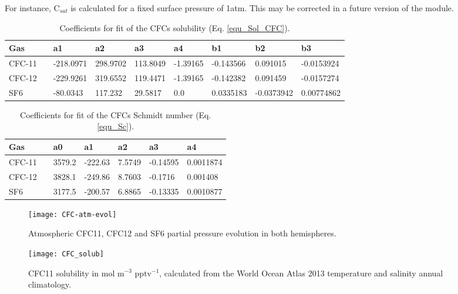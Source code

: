 \documentclass[../main/TOP_manual]{subfiles}
\begin{document}

For instance, C$_{sat}$ is calculated for a fixed surface pressure of 1atm. This may be corrected in a future version of the module.


\begin{table}[!t]
\caption{Coefficients for fit of the CFCs solubility (Eq. \autoref{equ_Sol_CFC}).}
\vskip4mm
\centering
\begin{tabular}{l l l l l l l l l}
\hline
Gas   & & a1 & a2 & a3 & a4 & b1 & b2 & b3 \\
\hline
CFC-11 & & -218.0971 & 298.9702 & 113.8049 & -1.39165 & -0.143566  & 0.091015   & -0.0153924 \\
CFC-12 & & -229.9261 & 319.6552 & 119.4471 & -1.39165 & -0.142382  & 0.091459   & -0.0157274 \\
SF6    & & -80.0343  & 117.232  & 29.5817  & 0.0      & 0.0335183  & -0.0373942 & 0.00774862 \\
\hline
\end{tabular}
\label{tab_ref_CFC}
\end{table}


\begin{table}[!t]
\caption{Coefficients for fit of the CFCs Schmidt number (Eq. \autoref{equ_Sc}).}
\vskip4mm
\centering
\begin{tabular}{l l l l l l l }
\hline
Gas  & & a0 & a1 & a2 & a3 & a4 \\
\hline
CFC-11 & & 3579.2  & -222.63 & 7.5749 & -0.14595 & 0.0011874   \\
CFC-12 & & 3828.1  & -249.86 & 8.7603 & -0.1716  & 0.001408    \\
SF6    & & 3177.5  & -200.57 & 6.8865 & -0.13335 & 0.0010877   \\
\hline
\end{tabular}
\label{tab_Sc}
\end{table}



\begin{figure}[!h]
\centering
\texttt{[image: CFC-atm-evol]}
  \caption{Atmospheric CFC11, CFC12 and SF6 partial pressure evolution in both hemispheres.}
\label{img_cfcatm}
\end{figure}

\begin{figure}[!h]
\centering
\texttt{[image: CFC\_solub]}
  \caption{CFC11 solubility in mol m$^{-3}$ pptv$^{-1}$, calculated from the World Ocean Atlas 2013 temperature and salinity annual climatology.}
\label{img_cfcsol}
\end{figure}
\end{document}
